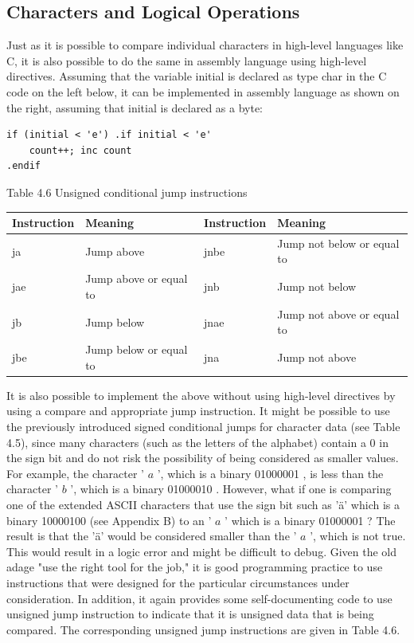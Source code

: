 \documentclass[10pt]{book}
\begin{document}
\subsection{Characters and Logical Operations}
Just as it is possible to compare individual characters in high-level languages like C, it is also possible to do the same in assembly language using high-level directives. Assuming that the variable initial is declared as type char in the C code on the left below, it can be implemented in assembly language as shown on the right, assuming that initial is declared as a byte:

\begin{verbatim}
if (initial < 'e') .if initial < 'e'
    count++; inc count
.endif
\end{verbatim}

Table 4.6 Unsigned conditional jump instructions

\begin{center}
\begin{tabular}{|l|l|l|l|}
\hline
Instruction & Meaning & Instruction & Meaning \\

\hline
ja & Jump above & jnbe & Jump not below or equal to \\
\hline
jae & Jump above or equal to & jnb & Jump not below \\
\hline
jb & Jump below & jnae & Jump not above or equal to \\
\hline
jbe & Jump below or equal to & jna & Jump not above \\
\hline
\end{tabular}
\end{center}

It is also possible to implement the above without using high-level directives by using a compare and appropriate jump instruction. It might be possible to use the previously introduced signed conditional jumps for character data (see Table 4.5), since many characters (such as the letters of the alphabet) contain a 0 in the sign bit and do not risk the possibility of being considered as smaller values. For example, the character ' $a$ ', which is a binary 01000001 , is less than the character ' $b$ ', which is a binary 01000010 . However, what if one is comparing one of the extended ASCII characters that use the sign bit such as 'ä' which is a binary 10000100 (see Appendix B) to an ' $a$ ' which is a binary 01000001 ? The result is that the 'ä' would be considered smaller than the ' $a$ ', which is not true. This would result in a logic error and might be difficult to debug. Given the old adage "use the right tool for the job," it is good programming practice to use instructions that were designed for the particular circumstances under consideration. In addition, it again provides some self-documenting code to use unsigned jump instruction to indicate that it is unsigned data that is being compared. The corresponding unsigned jump instructions are given in Table 4.6.
\end{document}
